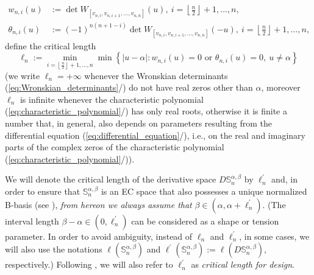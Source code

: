 \documentclass[b5paper, twosided]{book}
\DeclareRobustCommand{\mref}[1]{\ref{#1}{\relsize{-1}/\pageref{#1}}}
\begin{document}
\begin{itemize}
\begin{itemize}
        \begin{align}
            w_{n,i}\left(  u\right)  &:=\det W_{\left[  v_{n,i},v_{n,i+1},\ldots
                ,v_{n,n}\right]  }\left(  u\right)  ,~i=
            \left\lfloor \tfrac{n}{2}\right\rfloor +1,\ldots
            ,n,\label{eq:Wronskian_determinants}
            \\
            \theta_{n,i}\left(u\right) &:= \left(-1\right)^{n\left(n+1-i\right)}\det W_{\left[  v_{n,i},v_{n,i+1},\ldots,v_{n,n}\right]  }\left(  -u\right),~i=
            \left\lfloor \tfrac{n}{2}\right\rfloor +1,\ldots,n,
        \end{align}
        define the critical length%
        \begin{equation}
            \ell_{n}:=\min_{i=\left\lfloor \frac{n}{2}\right\rfloor +1,\ldots
                ,n}\min\left\{  \left\vert u - \alpha\right\vert :w_{n,i}\left(  u\right)
            =0\text{ or } \theta_{n,i}\left(u\right)=0,~u\neq\alpha\right\}
            \label{eq:critical_length}
        \end{equation}
        (we write $\ell_{n}=+\infty$ whenever the Wronskian determinants
        (\mref{eq:Wronskian_determinants}) do not have real zeros other than $\alpha$, moreover $\ell_{n}$ is infinite whenever the characteristic polynomial (\mref{eq:characteristic_polynomial}) has only real roots, otherwise it is finite a number that, in general, also depends on parameters resulting from the differential equation (\mref{eq:differential_equation}), i.e., on the real and imaginary parts of the complex zeros of the characteristic polynomial (\mref{eq:characteristic_polynomial})).
    \end{itemize}
\end{itemize}

We will denote the critical length of the derivative space $D\mathbb{S}_{n}^{\alpha,\beta}$ by $\ell_n^{\prime}$ and, in order to ensure that $\mathbb{S}_n^{\alpha, \beta}$ is an EC space that also possesses a unique normalized B-basis (see \cite[Theorem 4.1 and Corollary 4.1]{CarnicerMainarPena2004}), \textit{from hereon we always assume that} $\beta \in \left(\alpha, \alpha + \ell_n^{\prime}\right)$. (The interval length $\beta - \alpha \in \left(0,\ell_n^{\prime}\right)$ can be considered as a shape or tension parameter. In order to avoid ambiguity, instead of $\ell_{n}$ and $\ell_n^{\prime}$, in some cases, we will also use the notations $\ell\left( \mathbb{S}_n^{\alpha,\beta}\right)$ and $\ell^{\prime}\left( \mathbb{S}_n^{\alpha,\beta}\right):=\ell\left(D\mathbb{S}_{n}^{\alpha,\beta}\right)$, respectively.) Following \cite[p.\ 67]{CarnicerMainarPena2004}, we will also refer to $\ell_n^{\prime}$ as \textit{critical length for design}.
\end{document}

